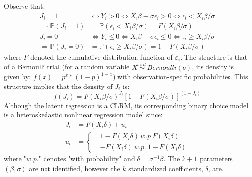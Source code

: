 \documentclass[12pt]{article}
\newcommand{\Prob}{\mathbb{P}}
\newcommand{\RA}{\Rightarrow}
\begin{document}
		Observe that:
		\begin{align*}
			J_{i}=1 &\Leftrightarrow Y_{i}>0 \Leftrightarrow X_{i} \beta-\sigma \epsilon_{i}>0 \Leftrightarrow \epsilon_{i}<X_{i} \beta / \sigma\\
			\RA \Prob\left(J_{i}=1\right)&=\Prob\left(\epsilon_{i}<X_{i} \beta / \sigma\right)=F\left(X_{i} \beta / \sigma\right)\\
			J_{i}=0 &\Leftrightarrow Y_{i} \leq 0 \Leftrightarrow X_{i} \beta-\sigma \epsilon_{i} \leq 0 \Leftrightarrow \epsilon_{i} \geq X_{i} \beta / \sigma\\
			\RA \Prob\left(J_{i}=0\right)&=\Prob\left(\epsilon_{i} \geq X_{i} \beta / \sigma\right)=1-F\left(X_{i} \beta / \sigma\right)
		\end{align*}
		where $ F $ denoted the cumulative distribution function of $ \varepsilon_i $. The structure is that of a Bernoulli trial (for a random variable $ X\overset{i.i.d.}{\sim}Bernoulli(p) $, its density is given by: $ f(x)=p^x *(1-p)^{1-x} $) with observation-specific probabilities. This structure implies that the density of $ J_i $ is:
		\begin{equation}
			f(J_i)=F\left(X_{i} \beta / \sigma\right)^{J_{i}}\left[1-F\left(X_{i} \beta / \sigma\right)\right]^{\left(1-J_{i}\right)}
		\end{equation}
		Although the latent regression is a CLRM, its corresponding binary choice model is a heteroskedastic nonlinear regression model since:
		\begin{align*}
			J_i&=F(X_i \delta) + u_i\\
			u_i&=\begin{cases}
			&1-F(X_i \delta)\ w.p\ F(X_i \delta)\\
			&-F(X_i \delta)\ w.p.\ 1-F(X_i \delta)
			\end{cases}
		\end{align*}
		where "$ w.p. $" denotes "with probability" and $ \delta=\sigma^{-1}\beta $. The $ k+1 $ parameters $ (\beta, \sigma) $ are not identified, however the $ k $ standardized coefficients, $ \delta $, are. 
		
\end{document}
